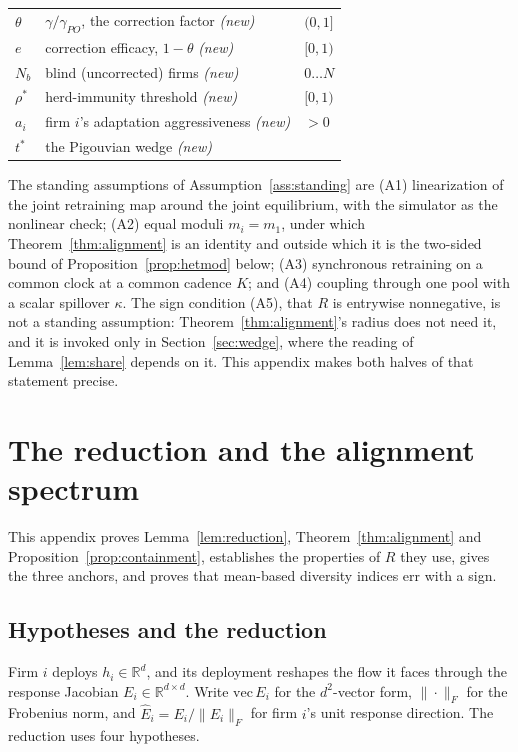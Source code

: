 \begin{center}
\begin{tabular}{lll}
$\theta$ & $\gamma/\gamma_{PO}$, the correction factor \emph{(new)} & $(0,1]$ \\
$e$ & correction efficacy, $1-\theta$ \emph{(new)} & $[0,1)$ \\
$N_b$ & blind (uncorrected) firms \emph{(new)} & $0 \ldots N$ \\
$\rho^\ast$ & herd-immunity threshold \emph{(new)} & $[0,1)$ \\
$a_i$ & firm $i$'s adaptation aggressiveness \emph{(new)} & $>0$ \\
$t^\ast$ & the Pigouvian wedge \emph{(new)} & \\
\bottomrule
\end{tabular}
\end{center}

The standing assumptions of Assumption~\ref{ass:standing} are (A1) linearization of the joint retraining map around the joint equilibrium, with the simulator as the nonlinear check; (A2) equal moduli $m_i = m_1$, under which Theorem~\ref{thm:alignment} is an identity and outside which it is the two-sided bound of Proposition~\ref{prop:hetmod} below; (A3) synchronous retraining on a common clock at a common cadence $K$; and (A4) coupling through one pool with a scalar spillover $\kappa$. The sign condition (A5), that $R$ is entrywise nonnegative, is not a standing assumption: Theorem~\ref{thm:alignment}'s radius does not need it, and it is invoked only in Section~\ref{sec:wedge}, where the reading of Lemma~\ref{lem:share} depends on it. This appendix makes both halves of that statement precise.

\section{The reduction and the alignment spectrum}
\label{app:alignment}

This appendix proves Lemma~\ref{lem:reduction}, Theorem~\ref{thm:alignment} and Proposition~\ref{prop:containment}, establishes the properties of $R$ they use, gives the three anchors, and proves that mean-based diversity indices err with a sign.

\subsection{Hypotheses and the reduction}

Firm $i$ deploys $h_i \in \mathbb{R}^d$, and its deployment reshapes the flow it faces through the response Jacobian $E_i \in \mathbb{R}^{d\times d}$. Write $\mathrm{vec}\, E_i$ for the $d^2$-vector form, $\|\cdot\|_F$ for the Frobenius norm, and $\hat{E}_i = E_i/\|E_i\|_F$ for firm $i$'s unit response direction. The reduction uses four hypotheses.

